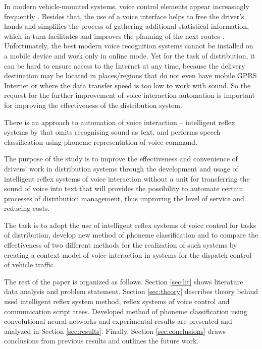 \documentclass[review,authoryear]{elsarticle}
\begin{document}
In modern vehicle-mounted systems, voice control elements appear increasingly frequently \citep{eng_art2,eng_Kravchenko_2009,Heisterkamp_2001}. Besides that, the use of a voice interface helps to free the driver’s hands and simplifies the process of gathering additional statistical information, which in turn facilitates and improves the planning of the next routes \citep{conf9}. Unfortunately, the best modern voice recognition systems cannot be installed on a mobile device and work only in online mode. Yet for the task of distribution, it can be hard to ensure access to the Internet at any time, because the delivery destination may be located in places/regions that do not even have mobile GPRS Internet or where the data transfer speed is too low to work with sound. So the request for the further improvement of voice interaction automation is important for improving the effectiveness of the distribution system.

There is an approach to automation of voice interaction – intelligent reflex systems by \cite{Teslia_2014} that omits recognising sound as text, and performs speech classification using phoneme representation of voice command.

The purpose of the study is to improve the effectiveness and convenience of drivers’ work in distribution systems through the development and usage of intelligent reflex systems of voice interaction without a unit for transferring the sound of voice into text that will provides the possibility to automate certain processes of distribution management, thus improving the level of service and reducing costs.

The task is to adopt the use of intelligent reflex systems of voice control for tasks of distribution, develop new method of phoneme classification and to compare the effectiveness of two different methods for the realization of such systems by creating a context model of voice interaction in systems for the dispatch control of vehicle traffic.

The rest of the paper is organized as follows. Section \ref{sec:lit} shows literature data analysis and problem statement. Section \ref{sec:theory} describes theory behind used intelligent reflex system method, reflex systems of voice control and communication script trees. Developed method of phoneme classification using convolutional neural networks and experimental results are presented and analyzed in Section \ref{sec:results}. Finally, Section \ref{sec:conclusions} draws conclusions from previous results and outlines the future work.
\end{document}
